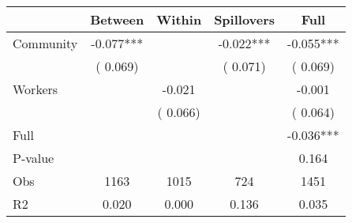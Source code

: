 
\begin{tabular}{l*{4}{c}}\hline&\multicolumn{1}{c}{Between}&\multicolumn{1}{c}{Within}&\multicolumn{1}{c}{Spillovers}&\multicolumn{1}{c}{Full}\\ \hline
 Community             &             -0.077***      &                                               &       -0.022*** &        -0.055***                            \\ 
                               &        (       0.069)           &                                       &       (       0.071)     &      (       0.069)                                           \\ 
 Workers       &                                               &       -0.021    &                                &            -0.001                            \\ 
                               &                                               & (       0.066)                  &                                        &      (       0.064)                                           \\ 
\hline                                                                                                                                                                                                                                            
 Full                  &                                               &                                               &                                        &            -0.036***                                     \\ 
 P-value               &                                               &                                               &                                        &             0.164                                           \\ 
 Obs                   &               1163               &       1015                       &       724                &              1451                                               \\ 
 R2                    &                      0.020              &              0.000                      &              0.136               &                     0.035                                              \\ 
\hline \end{tabular}                                                                                                                                                                                                              